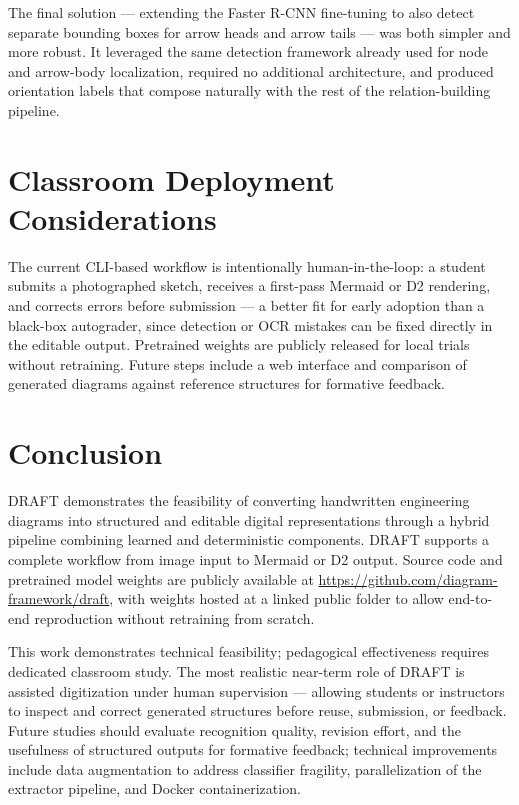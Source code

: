 \documentclass[conference]{IEEEtran}
\begin{document}
The final solution — extending the Faster R-CNN fine-tuning to also detect separate bounding boxes for arrow heads and arrow tails — was both simpler and more robust. It leveraged the same detection framework already used for node and arrow-body localization, required no additional architecture, and produced orientation labels that compose naturally with the rest of the relation-building pipeline.

\section{Classroom Deployment Considerations}
The current CLI-based workflow is intentionally human-in-the-loop: a student submits a photographed sketch, receives a first-pass Mermaid or D2 rendering, and corrects errors before submission — a better fit for early adoption than a black-box autograder, since detection or OCR mistakes can be fixed directly in the editable output. Pretrained weights are publicly released for local trials without retraining. Future steps include a web interface and comparison of generated diagrams against reference structures for formative feedback.

\section{Conclusion}
DRAFT demonstrates the feasibility of converting handwritten engineering diagrams into structured and editable digital representations through a hybrid pipeline combining learned and deterministic components. DRAFT supports a complete workflow from image input to Mermaid or D2 output. Source code and pretrained model weights are publicly available at \url{https://github.com/diagram-framework/draft}, with weights hosted at a linked public folder to allow end-to-end reproduction without retraining from scratch.

This work demonstrates technical feasibility; pedagogical effectiveness requires dedicated classroom study. The most realistic near-term role of DRAFT is assisted digitization under human supervision — allowing students or instructors to inspect and correct generated structures before reuse, submission, or feedback. Future studies should evaluate recognition quality, revision effort, and the usefulness of structured outputs for formative feedback; technical improvements include data augmentation to address classifier fragility, parallelization of the extractor pipeline, and Docker containerization.



\end{document}

